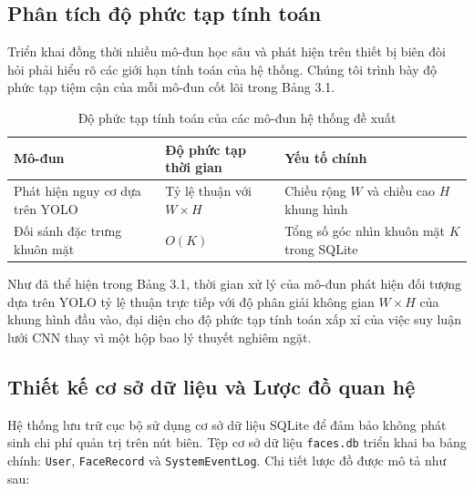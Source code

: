 \documentclass[12pt,a4paper]{article}
\begin{document}
\subsection{Phân tích độ phức tạp tính toán}
Triển khai đồng thời nhiều mô-đun học sâu và phát hiện trên thiết bị biên đòi hỏi phải hiểu rõ các giới hạn tính toán của hệ thống. Chúng tôi trình bày độ phức tạp tiệm cận của mỗi mô-đun cốt lõi trong Bảng 3.1.

\begin{table}[h]
    \centering
    \caption{Độ phức tạp tính toán của các mô-đun hệ thống đề xuất}
    \label{tab:complexity}
    \begin{tabular}{lll}
        \toprule
        \textbf{Mô-đun} & \textbf{Độ phức tạp thời gian} & \textbf{Yếu tố chính} \\
        \midrule
        Phát hiện nguy cơ dựa trên YOLO & Tỷ lệ thuận với $W \times H$ & Chiều rộng $W$ và chiều cao $H$ khung hình \\
        Đối sánh đặc trưng khuôn mặt & $O(K)$ & Tổng số góc nhìn khuôn mặt $K$ trong SQLite \\
        \bottomrule
    \end{tabular}
\end{table}

Như đã thể hiện trong Bảng 3.1, thời gian xử lý của mô-đun phát hiện đối tượng dựa trên YOLO tỷ lệ thuận trực tiếp với độ phân giải không gian $W \times H$ của khung hình đầu vào, đại diện cho độ phức tạp tính toán xấp xỉ của việc suy luận lưới CNN thay vì một hộp bao lý thuyết nghiêm ngặt.

\subsection{Thiết kế cơ sở dữ liệu và Lược đồ quan hệ}
Hệ thống lưu trữ cục bộ sử dụng cơ sở dữ liệu SQLite để đảm bảo không phát sinh chi phí quản trị trên nút biên. Tệp cơ sở dữ liệu \texttt{faces.db} triển khai ba bảng chính: \texttt{User}, \texttt{FaceRecord} và \texttt{SystemEventLog}. Chi tiết lược đồ được mô tả như sau:
\end{document}
